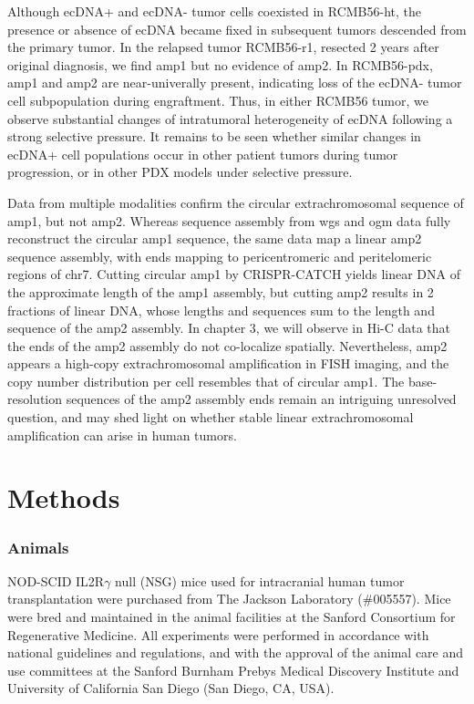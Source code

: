 \par Although ecDNA+ and ecDNA- tumor cells coexisted in RCMB56-ht, the presence or absence of ecDNA became fixed in subsequent tumors descended from the primary tumor. In the relapsed tumor RCMB56-r1, resected 2 years after original diagnosis, we find amp1 but no evidence of amp2. In RCMB56-pdx, amp1 and amp2 are near-univerally present, indicating loss of the ecDNA- tumor cell subpopulation during engraftment. Thus, in either RCMB56 tumor, we observe substantial changes of intratumoral heterogeneity of ecDNA following a strong selective pressure. It remains to be seen whether similar changes in ecDNA+ cell populations occur in other patient tumors during tumor progression, or in other PDX models under selective pressure.

\par Data from multiple modalities confirm the circular extrachromosomal sequence of amp1, but not amp2. Whereas sequence assembly from \gls{wgs} and \gls{ogm} data fully reconstruct the circular amp1 sequence, the same data map a linear amp2 sequence assembly, with ends mapping to pericentromeric and peritelomeric regions of chr7. Cutting circular amp1 by CRISPR-CATCH yields linear DNA of the approximate length of the amp1 assembly, but cutting amp2 results in 2 fractions of linear DNA, whose lengths and sequences sum to the length and sequence of the amp2 assembly. In chapter 3, we will observe in Hi-C data that the ends of the amp2 assembly do not co-localize spatially. Nevertheless, amp2 appears a high-copy extrachromosomal amplification in FISH imaging, and the copy number distribution per cell resembles that of circular amp1. The base-resolution sequences of the amp2 assembly ends remain an intriguing unresolved question, and may shed light on whether stable linear extrachromosomal amplification can arise in human tumors.


\section{Methods}
\subsubsection{Animals}
NOD-SCID IL2R$\gamma$ null (NSG) mice used for intracranial human tumor transplantation were purchased from The Jackson Laboratory (\#005557). Mice were bred and maintained in the animal facilities at the Sanford Consortium for Regenerative Medicine. All experiments were performed in accordance with national guidelines and regulations, and with the approval of the animal care and use committees at the Sanford Burnham Prebys Medical Discovery Institute and University of California San Diego (San Diego, CA, USA).

